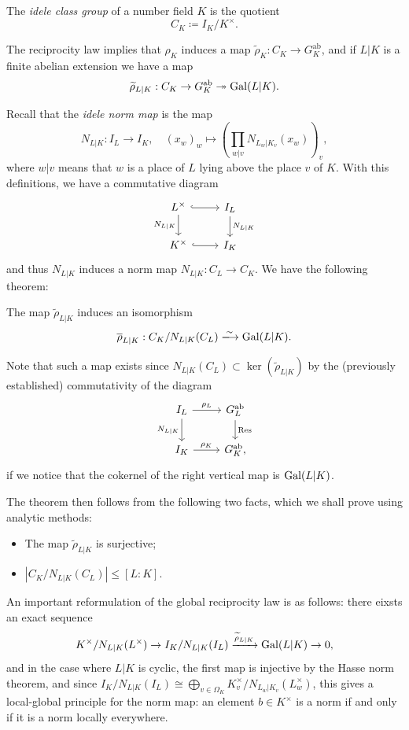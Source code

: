 \documentclass{article}
\begin{document}
\begin{defn}
		The \emph{idele class group} of a number field $K$ is the quotient
		\[
			C_K \coloneqq I_K / K^\times.
		\]
\end{defn}
The reciprocity law implies that $\rho_K$ induces a map $\widetilde{\rho}_K: C_K \to G_K^\text{ab}$, and if $L|K$ is a finite abelian extension we have a map 
\[\widetilde{\rho}_{L|K}: C_K \to G_K^\text{ab} \twoheadrightarrow \operatorname{Gal}(L|K).\]

\noindent Recall that the \emph{idele norm map} is the map
\[
	N_{L|K}: I_L \to I_K, \quad (x_w)_w \mapsto \left(\prod_{w|v} N_{L_w|K_v}(x_w)\right)_v,
\]
where $w|v$ means that $w$ is a place of $L$ lying above the place $v$ of $K$. With this definitions, we have a commutative diagram
\[
	\begin{tikzcd}
			L^\times \arrow[r, hook] \arrow[d, "N_{L|K}"'] & I_L \arrow[d, "N_{L|K}"] \\
			K^\times \arrow[r, hook] & I_K
	\end{tikzcd}
\]
and thus $N_{L|K}$ induces a norm map $N_{L|K}: C_L \to C_K$. We have the following theorem:
\begin{thm}
		The map $\widetilde{\rho}_{L|K}$ induces an isomorphism
		\[
			\overline{\rho}_{L|K}: C_K / N_{L|K}(C_L) \xlongrightarrow{\sim} \Gal(L|K).
		\]
\end{thm}
Note that such a map exists since $N_{L|K}(C_L)\subset \ker(\widetilde{\rho}_{L|K})$ by the (previously established) commutativity of the diagram
\[
	\begin{tikzcd}
		I_L \arrow[r, "\rho_L"] \arrow[d, "N_{L|K}"'] & G_L^\text{ab} \arrow[d, "\operatorname{Res}"] \\
		I_K \arrow[r, "\rho_K"] & G_K^\text{ab},
	\end{tikzcd}
\]
if we notice that the cokernel of the right vertical map is $\operatorname{Gal}(L|K)$.

The theorem then follows from the following two facts, which we shall prove using analytic methods:
\begin{itemize}
		\item The map $\widetilde{\rho}_{L|K}$ is surjective;
		\item $\left|C_K / N_{L|K}(C_L)\right| \leq [L:K]$.
\end{itemize}

\medskip

\noindent An important reformulation of the global reciprocity law is as follows: there eixsts an exact sequence
\[
	K^\times /N_{L|K}(L^\times) \to I_K / N_{L|K}(I_L) \xrightarrow{\widetilde{\rho}_{L|K}} \operatorname{Gal}(L|K) \to 0,	
\]
and in the case where $L|K$ is cyclic, the first map is injective by the Hasse norm theorem, and since $I_K / N_{L|K}(I_L)\cong \bigoplus_{v\in \Omega_K} K_v^\times / N_{L_w|K_v}(L_w^\times)$, this gives a local-global principle for the norm map: an element $b\in K^\times$ is a norm if and only if it is a norm locally everywhere.
\end{document}
